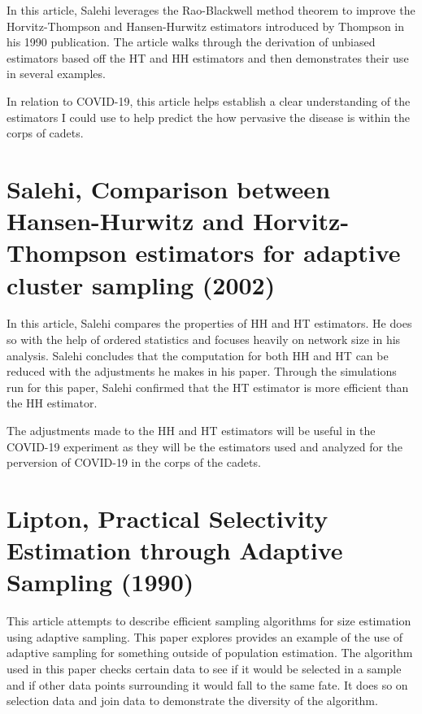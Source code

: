 \documentclass{article}
\begin{document}
In this article, Salehi leverages the Rao-Blackwell method theorem to improve the Horvitz-Thompson and Hansen-Hurwitz estimators introduced by Thompson in his 1990 publication. The article walks through the derivation of unbiased estimators based off the HT and HH estimators and then demonstrates their use in several examples. \cite{mohammad1999rao}

In relation to COVID-19, this article helps establish a clear understanding of the estimators I could use to help predict the how pervasive the disease is within the corps of cadets. 


\section{Salehi, Comparison between Hansen-Hurwitz and Horvitz-Thompson estimators for adaptive cluster sampling (2002)}
In this article, Salehi compares the properties of HH and HT estimators.  He does so with the help of ordered statistics and focuses heavily on network size in his analysis. Salehi concludes that the computation for both HH and HT can be reduced with the adjustments he makes in his paper. Through the simulations run for this paper, Salehi confirmed that the HT estimator is more efficient than the HH estimator. \cite{salehi2003comparison}

The adjustments made to the HH and HT estimators will be useful in the COVID-19 experiment as they will be the estimators used and analyzed for the perversion of COVID-19 in the corps of the cadets.

\section{Lipton, Practical Selectivity Estimation through Adaptive Sampling (1990)}
This article attempts to describe efficient sampling algorithms for size estimation using adaptive sampling. This paper explores provides an example of the use of adaptive sampling for something outside of population estimation. The algorithm used in this paper checks certain data to see if it would be selected in a sample and if other data points surrounding it would fall to the same fate. It does so on selection data and join data to demonstrate the diversity of the algorithm. \cite{lipton1990practical}
\end{document}
